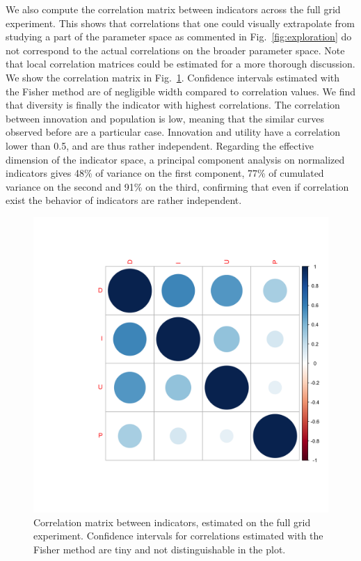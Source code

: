 \documentclass[letterpaper]{article}
\begin{document}
We also compute the correlation matrix between indicators across the full grid experiment. This shows that correlations that one could visually extrapolate from studying a part of the parameter space as commented in Fig.~\ref{fig:exploration} do not correspond to the actual correlations on the broader parameter space. Note that local correlation matrices could be estimated for a more thorough discussion. We show the correlation matrix in Fig.~\ref{fig:cormat}. Confidence intervals estimated with the Fisher method are of negligible width compared to correlation values. We find that diversity is finally the indicator with highest correlations. The correlation between innovation and population is low, meaning that the similar curves observed before are a particular case. Innovation and utility have a correlation lower than 0.5, and are thus rather independent. Regarding the effective dimension of the indicator space, a principal component analysis on normalized indicators gives 48\% of variance on the first component, 77\% of cumulated variance on the second and 91\% on the third, confirming that even if correlation exist the behavior of indicators are rather independent.

\begin{figure}[t]
	\centering
	\includegraphics[width=\linewidth,trim={6cm 6cm 0 6cm}]{figures/corrmat_indics.png}
	\caption{Correlation matrix between indicators, estimated on the full grid experiment. Confidence intervals for correlations estimated with the Fisher method are tiny and not distinguishable in the plot.\label{fig:cormat}}
\end{figure}
\end{document}
